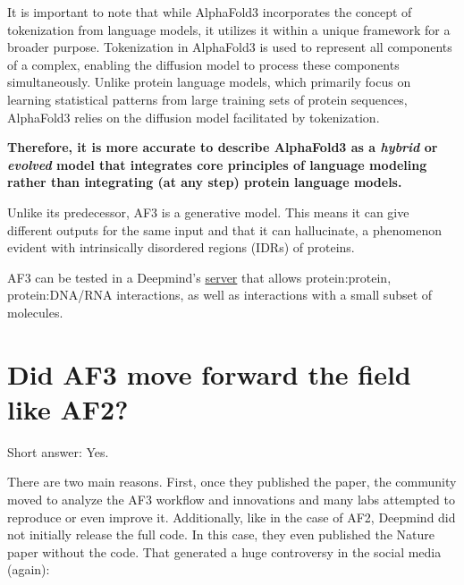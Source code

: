 \documentclass[
]{scrbook}
\begin{document}
\begin{tcolorbox}[enhanced jigsaw, toptitle=1mm, colbacktitle=quarto-callout-warning-color!10!white, breakable, opacityback=0, coltitle=black, arc=.35mm, colback=white, leftrule=.75mm, titlerule=0mm, colframe=quarto-callout-warning-color-frame, opacitybacktitle=0.6, bottomtitle=1mm, title=\textcolor{quarto-callout-warning-color}{\faExclamationTriangle}\hspace{0.5em}{Warning}, bottomrule=.15mm, toprule=.15mm, left=2mm, rightrule=.15mm]

It is important to note that while AlphaFold3 incorporates the concept
of tokenization from language models, it utilizes it within a unique
framework for a broader purpose. Tokenization in AlphaFold3 is used to
represent all components of a complex, enabling the diffusion model to
process these components simultaneously. Unlike protein language models,
which primarily focus on learning statistical patterns from large
training sets of protein sequences, AlphaFold3 relies on the diffusion
model facilitated by tokenization.

\textbf{Therefore, it is more accurate to describe AlphaFold3 as a
\emph{hybrid} or \emph{evolved} model that integrates core principles of
language modeling rather than integrating (at any step) protein language
models.}

\end{tcolorbox}

Unlike its predecessor, AF3 is a generative model. This means it can
give different outputs for the same input and that it can hallucinate, a
phenomenon evident with intrinsically disordered regions (IDRs) of
proteins.

AF3 can be tested in a Deepmind's
\href{https://alphafoldserver.com/}{server} that allows protein:protein,
protein:DNA/RNA interactions, as well as interactions with a small
subset of molecules.

\section{Did AF3 move forward the field like
AF2?}\label{did-af3-move-forward-the-field-like-af2}

Short answer: Yes.

There are two main reasons. First, once they published the paper, the
community moved to analyze the AF3 workflow and innovations and many
labs attempted to reproduce or even improve it. Additionally, like in
the case of AF2, Deepmind did not initially release the full code. In
this case, they even published the Nature paper without the code. That
generated a huge controversy in the social media (again):
\end{document}
